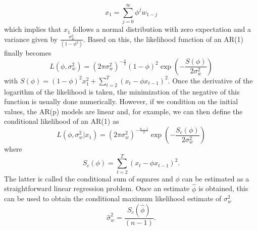 \documentclass[]{book}
\theoremstyle{definition}
\theoremstyle{definition}
\theoremstyle{definition}
\theoremstyle{remark}
\begin{document}
{\begin{equation*}
x_1 = \sum_{j=0}^{\infty} \phi^j w_{1-j} 
\end{equation*} which implies that \(x_1\) follows a normal distribution
with zero expectation and a variance given by
\(\frac{\sigma_w^2}{(1-\phi^2)}\). Based on this, the likelihood
function of an AR(1) finally becomes \begin{equation*}
L(\phi,\sigma_w^2) = (2\pi \sigma_w^2)^{-\frac{n}{2}} (1 - \phi)^2 \exp \left(-\frac{S(\phi)}{2 \sigma_w^2}\right)
\end{equation*} with
\(S(\phi) = (1-\phi)^2 x_1^2 + \sum_{t=2}^T (x_t -\phi x_{t-1})^2\).
Once the derivative of the logarithm of the likelihood is taken, the
minimization of the negative of this function is usually done
numerically. However, if we condition on the initial values, the AR(p)
models are linear and, for example, we can then define the conditional
likelihood of an AR(1) as \begin{equation*}
L(\phi,\sigma_w^2|x_1) = (2\pi \sigma_w^2)^{-\frac{n-1}{2}} \exp \left(-\frac{S_c(\phi)}{2 \sigma_w^2}\right)
\end{equation*} where \begin{equation*}
S_c(\phi) = \sum_{t=2}^T (x_t -\phi x_{t-1})^2 .
\end{equation*} The latter is called the conditional sum of squares and
\(\phi\) can be estimated as a straightforward linear regression
problem. Once an estimate \(\hat{\phi}\) is obtained, this can be used
to obtain the conditional maximum likelihood estimate of \(\sigma_w^2\)
\begin{equation*}
\hat{\sigma}_w^2 = \frac{S_c(\hat{\phi})}{(n-1)} .
\end{equation*}

}
\end{document}
